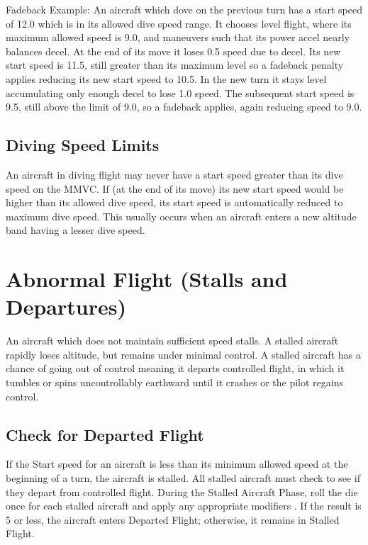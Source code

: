 Fadeback Example: An aircraft which dove on the previous turn has a start speed of 12.0 which is in its allowed dive speed range. It chooses level flight, where its maximum allowed speed is 9.0, and maneuvers such that its power accel nearly balances decel. At the end of its move it loses 0.5 speed due to decel. Its new start speed is 11.5, still greater than its maximum level so a fadeback penalty applies reducing its new start speed to 10.5. In the new turn it stays level accumulating only enough decel to lose 1.0 speed. The subsequent start speed is 9.5, still above the limit of 9.0, so a fadeback applies, again reducing speed to 9.0.

\subsection{Diving Speed Limits} An aircraft in diving flight may never have a start speed greater than its dive speed on the MMVC. If (at the end of its move) its new start speed would be higher than its allowed dive speed, its start speed is automatically reduced to maximum dive speed. This usually occurs when an aircraft enters a new altitude band having a lesser dive speed. 

\section{Abnormal Flight (Stalls and Departures)}
\label{rule:abnormal-flight}

An aircraft which does not maintain sufficient speed stalls. A stalled aircraft rapidly loses altitude, but remains under minimal control. A stalled aircraft has a chance of going out of control meaning it departs controlled flight, in which it tumbles or spins uncontrollably earthward until it crashes or the pilot regains control.


\subsection{Check for Departed Flight}
If the Start speed for an aircraft is less than its minimum allowed speed at the beginning of a turn, the aircraft is stalled. All stalled aircraft must check to see if they depart from controlled flight. During the Stalled Aircraft Phase, roll the die once for each stalled aircraft and apply any appropriate modifiers . If the result is 5 or less, the aircraft enters Departed Flight; otherwise, it remains in Stalled Flight.

